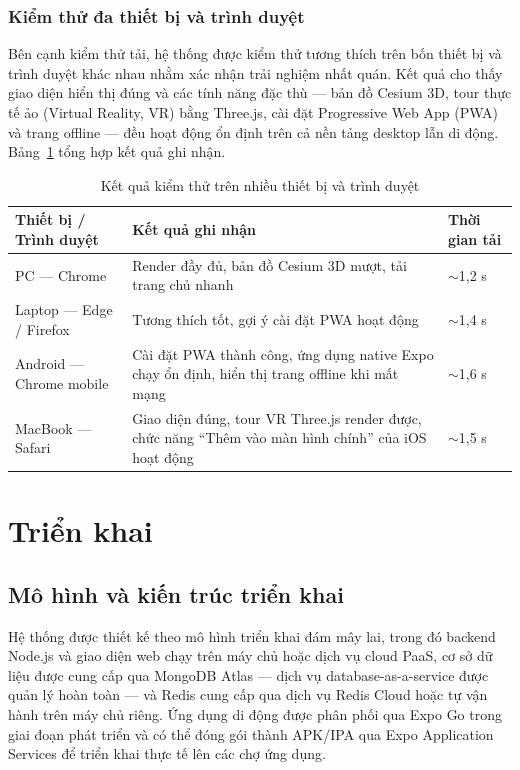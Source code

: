 \documentclass[../DoAn.tex]{subfiles}
\begin{document}
\subsubsection*{Kiểm thử đa thiết bị và trình duyệt}

Bên cạnh kiểm thử tải, hệ thống được kiểm thử tương thích trên bốn thiết bị và
trình duyệt khác nhau nhằm xác nhận trải nghiệm nhất quán. Kết quả cho thấy giao
diện hiển thị đúng và các tính năng đặc thù --- bản đồ Cesium 3D, tour thực tế ảo
(Virtual Reality, VR) bằng Three.js, cài đặt Progressive Web App (PWA) và trang
offline --- đều hoạt động ổn định trên cả nền tảng desktop lẫn di động.
Bảng~\ref{tab:cross-device-test} tổng hợp kết quả ghi nhận.

\begin{table}[H]
\centering
\caption{Kết quả kiểm thử trên nhiều thiết bị và trình duyệt}
\label{tab:cross-device-test}
\footnotesize
\begin{tabular}{|p{3.4cm}|p{8.2cm}|p{1.8cm}|}
\hline
\textbf{Thiết bị / Trình duyệt} & \textbf{Kết quả ghi nhận} & \textbf{Thời gian tải} \\
\hline
PC --- Chrome & Render đầy đủ, bản đồ Cesium 3D mượt, tải trang chủ nhanh & $\sim$1,2 s \\
\hline
Laptop --- Edge / Firefox & Tương thích tốt, gợi ý cài đặt PWA hoạt động & $\sim$1,4 s \\
\hline
Android --- Chrome mobile & Cài đặt PWA thành công, ứng dụng native Expo chạy ổn định, hiển thị trang offline khi mất mạng & $\sim$1,6 s \\
\hline
MacBook --- Safari & Giao diện đúng, tour VR Three.js render được, chức năng ``Thêm vào màn hình chính'' của iOS hoạt động & $\sim$1,5 s \\
\hline
\end{tabular}
\end{table}

\section{Triển khai}
\label{sec:deployment}

\subsection*{Mô hình và kiến trúc triển khai}

Hệ thống được thiết kế theo mô hình triển khai đám mây lai, trong đó backend
Node.js và giao diện web chạy trên máy chủ hoặc dịch vụ cloud PaaS, cơ sở dữ
liệu được cung cấp qua MongoDB Atlas --- dịch vụ database-as-a-service được quản
lý hoàn toàn --- và Redis cung cấp qua dịch vụ Redis Cloud hoặc tự vận hành trên
máy chủ riêng. Ứng dụng di động được phân phối qua Expo Go trong giai đoạn phát
triển và có thể đóng gói thành APK/IPA qua Expo Application Services để triển
khai thực tế lên các chợ ứng dụng.
\end{document}
